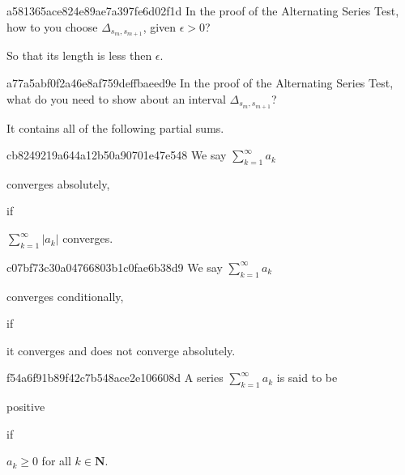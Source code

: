 \begin{note}{a581365ace824e89ae7a397fe6d02f1d}
    In the proof of the Alternating Series Test, how to you choose \({ \Delta_{s_m, s_{m+1}} }\), given \({ \epsilon > 0 }\)?

    \begin{cloze}{1}
        So that its length is less then \({ \epsilon }\).
    \end{cloze}
\end{note}

\begin{note}{a77a5abf0f2a46e8af759deffbaeed9e}
    In the proof of the Alternating Series Test, what do you need to show about an interval \({ \Delta_{s_m, s_{m+1}} }\)?

    \begin{cloze}{1}
        It contains all of the following partial sums.
    \end{cloze}
\end{note}

\begin{note}{cb8249219a644a12b50a90701e47e548}
    We say \({ \sum_{k=1}^{\infty} a_k }\) \begin{icloze}{2}converges absolutely,\end{icloze} if \begin{icloze}{1}\({ \sum_{k=1}^{\infty} \left\lvert a_k \right\rvert }\) converges.\end{icloze}
\end{note}

\begin{note}{c07bf73c30a04766803b1c0fae6b38d9}
    We say \({ \sum_{k=1}^{\infty} a_k }\) \begin{icloze}{2}converges conditionally,\end{icloze} if \begin{icloze}{1}it converges and does not converge absolutely.\end{icloze}
\end{note}

\begin{note}{f54a6f91b89f42c7b548ace2e106608d}
    A series \({ \sum_{k=1}^{\infty} a_k }\) is said to be \begin{icloze}{2}positive\end{icloze} if \begin{icloze}{1}\({ a_k \geq 0 }\) for all \({ k \in \mathbf{N} }\).\end{icloze}
\end{note}

